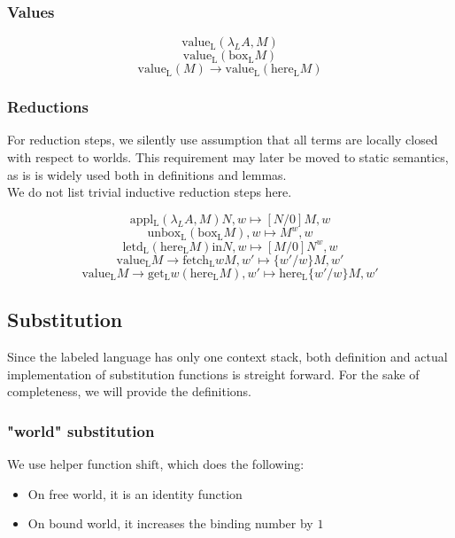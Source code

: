 \documentclass[12pt]{article}
\begin{document}
\subsubsection{Values}
$$\mathrm{value_L}(\lambda_L A, M)$$
$$\mathrm{value_L}(\mathrm{box_L} M)$$
$$\mathrm{value_L}(M) \rightarrow \mathrm{value_L}(\mathrm{here_L} M)$$

\subsubsection{Reductions}
For reduction steps, we silently use assumption that all terms are locally closed with respect to worlds.
This requirement may later be moved to static semantics, as is is widely used both in definitions and lemmas.\\
We do not list trivial inductive reduction steps here.

$$ \mathrm{appl_L} (\lambda_L A, M) N, w  \mapsto [ N / 0 ] M, w $$
$$ \mathrm{unbox_L} (\mathrm{box_L} M ), w \mapsto M^w, w $$
$$ \mathrm{letd_L} (\mathrm{here_L} M) \mathrm{in} N, w \mapsto [ M / 0 ] N^w, w $$
$$ \mathrm{value_L} M \rightarrow \mathrm{fetch_L} w M, w' \mapsto \{ w' / w \} M, w' $$
$$ \mathrm{value_L} M \rightarrow 
		\mathrm{get_L} w (\mathrm{here_L} M) , w' \mapsto 
		\mathrm{here_L} \{ w' / w \} M, w' $$

\subsection{Substitution}
Since the labeled language has only one context stack, both definition and actual implementation of substitution functions is streight forward. For the sake of completeness, we will provide the definitions.

\subsubsection{"world" substitution}
We use helper function $\mathrm{shift}$, which does the following:
\begin{itemize}
	\item On free world, it is an identity function
	\item On bound world, it increases the binding number by $1$
\end{itemize}
\end{document}
